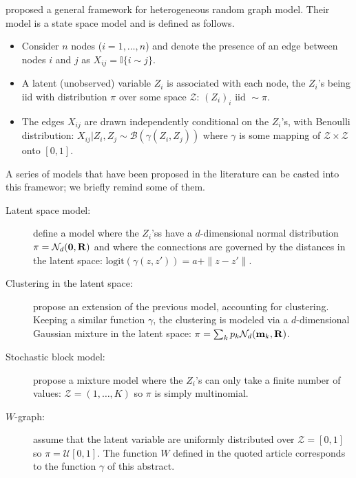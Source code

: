 \documentclass{svmult}
\begin{document}
\cite{BJR07} proposed a general framework for heterogeneous random graph model. Their model is a state space model and is defined as follows. 
\begin{itemize}
\item Consider $n$ nodes ($i = 1, \dots, n$) and denote the presence of an edge between nodes $i$ and $j$ as $X_{ij} = \mathbb I\{i \sim j\}$.
\item A latent (unobserved) variable $Z_i$ is associated with each node, the $Z_i$'s being iid with distribution $\pi$ over some space $\mathcal Z$: $
(Z_i)_i \text{ iid } \sim \pi.$
\item The edges $X_{ij}$ are drawn independently conditional on the $Z_i$'s, with Benoulli distribution:
$X_{ij} | Z_i, Z_j \sim \mathcal B(\gamma(Z_i, Z_j))$
where $\gamma$ is some mapping of $\mathcal Z \times \mathcal Z$ onto $[0, 1]$.
\end{itemize}
A series of models that have been proposed in the literature can be casted into this framewor; we briefly remind some of them.
\begin{description}
 \item[Latent space model:] \cite{HRH02} define a model where the $Z_i$'ss have a $d$-dimensional normal distribution $\pi = \mathcal N_d(\bf 0, \bf R)$ and where the connections are governed by the distances in the latent space: $\text{logit}(\gamma(z, z')) = a + \|z - z'\|$.
 \item[Clustering in the latent space:] \cite{HRT07} propose an extension of the previous model, accounting for clustering. Keeping a similar function $\gamma$, the clustering is modeled via a $d$-dimensional Gaussian mixture in the latent space: $\pi = \sum_k p_k \mathcal N_d({\bf m}_k, \bf R)$.
 \item[Stochastic block model:] \cite{NoS01} propose a mixture model where the $Z_i$'s can only take a finite number of values: $\mathcal Z = (1, \dots, K)$ so $\pi$ is simply multinomial.
 \item[$W$-graph:] \cite{LoS06} assume that the latent variable are uniformly distributed over $\mathcal Z = [0, 1]$ so $\pi = \mathcal U[0, 1]$. The function $W$ defined in the quoted article corresponds to the function $\gamma$ of this abstract.
\end{description}
\end{document}
